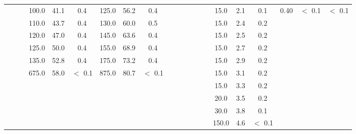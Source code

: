 \begin{landscape}
\begin{table}
{\begin{tabular}{ccc:ccc:ccc:ccc:ccc:ccc:ccc}
	\NA{} & \NA{} & \NA{} & 100.0 & 41.1 & 0.4 & 125.0 & 56.2 & 0.4 & \NA{} & \NA{} & \NA{} & \NA{} & \NA{} & \NA{} & 15.0 & 2.1 & 0.1 & 0.40 & $<$ 0.1 & $<$ 0.1  \\ 
	\NA{} & \NA{} & \NA{} & 110.0 & 43.7 & 0.4 & 130.0 & 60.0 & 0.5 & \NA{} & \NA{} & \NA{} & \NA{} & \NA{} & \NA{} & 15.0 & 2.4 & 0.2 & \NA{} & \NA{} & \NA{}  \\ 
	\NA{} & \NA{} & \NA{} & 120.0 & 47.0 & 0.4 & 145.0 & 63.6 & 0.4 & \NA{} & \NA{} & \NA{} & \NA{} & \NA{} & \NA{} & 15.0 & 2.5 & 0.2 & \NA{} & \NA{} & \NA{}  \\ 
	\NA{} & \NA{} & \NA{} & 125.0 & 50.0 & 0.4 & 155.0 & 68.9 & 0.4 & \NA{} & \NA{} & \NA{} & \NA{} & \NA{} & \NA{} & 15.0 & 2.7 & 0.2 & \NA{} & \NA{} & \NA{}  \\ 
	\NA{} & \NA{} & \NA{} & 135.0 & 52.8 & 0.4 & 175.0 & 73.2 & 0.4 & \NA{} & \NA{} & \NA{} & \NA{} & \NA{} & \NA{} & 15.0 & 2.9 & 0.2 & \NA{} & \NA{} & \NA{}  \\ 
	\NA{} & \NA{} & \NA{} & 675.0 & 58.0 & $<$ 0.1 & 875.0 & 80.7 & $<$ 0.1 & \NA{} & \NA{} & \NA{} & \NA{} & \NA{} & \NA{} & 15.0 & 3.1 & 0.2 & \NA{} & \NA{} & \NA{}  \\ 
	\NA{} & \NA{} & \NA{} & \NA{} & \NA{} & \NA{} & \NA{} & \NA{} & \NA{} & \NA{} & \NA{} & \NA{} & \NA{} & \NA{} & \NA{} & 15.0 & 3.3 & 0.2 & \NA{} & \NA{} & \NA{}  \\ 
	\NA{} & \NA{} & \NA{} & \NA{} & \NA{} & \NA{} & \NA{} & \NA{} & \NA{} & \NA{} & \NA{} & \NA{} & \NA{} & \NA{} & \NA{} & 20.0 & 3.5 & 0.2 & \NA{} & \NA{} & \NA{}  \\ 
	\NA{} & \NA{} & \NA{} & \NA{} & \NA{} & \NA{} & \NA{} & \NA{} & \NA{} & \NA{} & \NA{} & \NA{} & \NA{} & \NA{} & \NA{} & 30.0 & 3.8 & 0.1 & \NA{} & \NA{} & \NA{}  \\ 
	\NA{} & \NA{} & \NA{} & \NA{} & \NA{} & \NA{} & \NA{} & \NA{} & \NA{} & \NA{} & \NA{} & \NA{} & \NA{} & \NA{} & \NA{} & 150.0 & 4.6 & $<$ 0.1 & \NA{} & \NA{} & \NA{}  \\ 
	\end{tabular}%
}
\end{table}
\begin{table}
	\centering
	\caption{A comparison of the bin width and the resolution in each bin for all event variables in the muon channel. }
	\label{tb:binning_muon}
\end{table}
\end{landscape}
